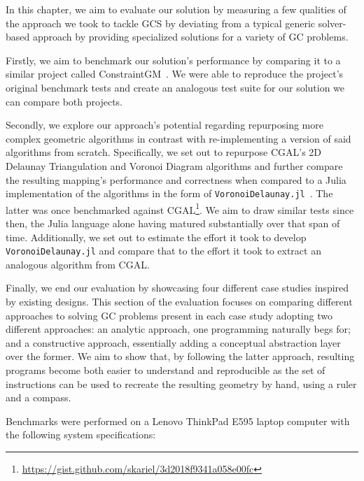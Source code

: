 %
\label{chap:eval}
\cleardoublepage{}

\noindent In this chapter, we aim to evaluate our solution by measuring a few
qualities of the approach we took to tackle \ac{GCS} by deviating from a typical
generic solver-based approach by providing specialized solutions for a variety
of \ac{GC} problems.

Firstly, we aim to benchmark our solution's performance by comparing it to a
similar project called ConstraintGM~\cite{Pinheiro:2016:MGR}.  We were able to
reproduce the project's original benchmark tests and create an analogous test
suite for our solution we can compare both projects.

Secondly, we explore our approach's potential regarding repurposing more complex
geometric algorithms in contrast with re-implementing a version of said
algorithms from scratch.  Specifically, we set out to repurpose \ac{CGAL}'s 2D
Delaunay Triangulation and Voronoi Diagram algorithms and further compare the
resulting mapping's performance and correctness when compared to a Julia
implementation of the algorithms in the form of
\texttt{VoronoiDelaunay.jl}~\cite{Keselman:2014:VoronoiDelaunay.jl}.  The latter
was once benchmarked against
\ac{CGAL}\footnote{\url{https://gist.github.com/skariel/3d2018f9341a058e00fc}}.
We aim to draw similar tests since then, the Julia language alone having matured
substantially over that span of time.  Additionally, we set out to estimate the
effort it took to develop \texttt{VoronoiDelaunay.jl} and compare that to the
effort it took to extract an analogous algorithm from \ac{CGAL}.

Finally, we end our evaluation by showcasing four different case studies
inspired by existing designs.  This section of the evaluation focuses on
comparing different approaches to solving \ac{GC} problems present in each case
study adopting two different approaches: an analytic approach, one programming
naturally begs for; and a constructive approach, essentially adding a conceptual
abstraction layer over the former.  We aim to show that, by following the latter
approach, resulting programs become both easier to understand and reproducible
as the set of instructions can be used to recreate the resulting geometry by
hand, using a ruler and a compass.

Benchmarks were performed on a Lenovo ThinkPad E595 laptop computer with the
following system specifications:

